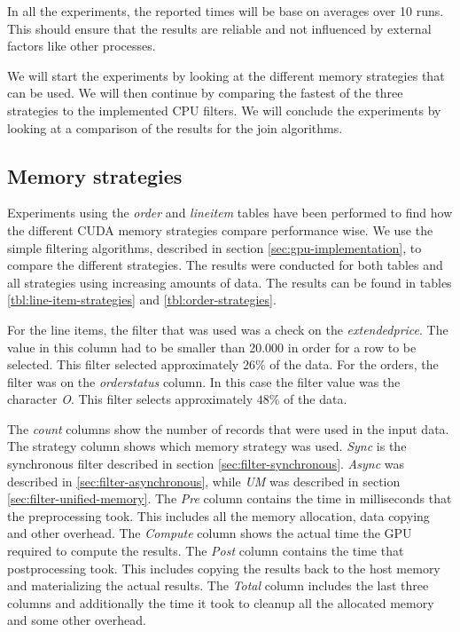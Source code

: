\documentclass[a4paper,titlepage]{article}
\begin{document}
In all the experiments, the reported times will be base on averages over 10 runs. This should ensure that the results are reliable and not influenced by external factors like other processes.

We will start the experiments by looking at the different memory strategies that can be used. We will then continue by comparing the fastest of the three strategies to the implemented CPU filters. We will conclude the experiments by looking at a comparison of the results for the join algorithms.

\subsection{Memory strategies}
Experiments using the \emph{order} and \emph{lineitem} tables have been performed to find how the different CUDA memory strategies compare performance wise. We use the simple filtering algorithms, described in section \ref{sec:gpu-implementation}, to compare the different strategies. The results were conducted for both tables and all strategies using increasing amounts of data. The results can be found in tables \ref{tbl:line-item-strategies} and \ref{tbl:order-strategies}.

For the line items, the filter that was used was a check on the \emph{extendedprice}. The value in this column had to be smaller than 20.000 in order for a row to be selected. This filter selected approximately $26\%$ of the data. For the orders, the filter was on the \emph{orderstatus} column. In this case the filter value was the character \emph{O}. This filter selects approximately $48\%$ of the data.

The \emph{count} columns show the number of records that were used in the input data. The strategy column shows which memory strategy was used. \emph{Sync} is the synchronous filter described in section \ref{sec:filter-synchronous}. \emph{Async} was described in \ref{sec:filter-asynchronous}, while \emph{UM} was described in section \ref{sec:filter-unified-memory}. The \emph{Pre} column contains the time in milliseconds that the preprocessing took. This includes all the memory allocation, data copying and other overhead. The \emph{Compute} column shows the actual time the GPU required to compute the results. The \emph{Post} column contains the time that postprocessing took. This includes copying the results back to the host memory and materializing the actual results. The \emph{Total} column includes the last three columns and additionally the time it took to cleanup all the allocated memory and some other overhead.
\end{document}
